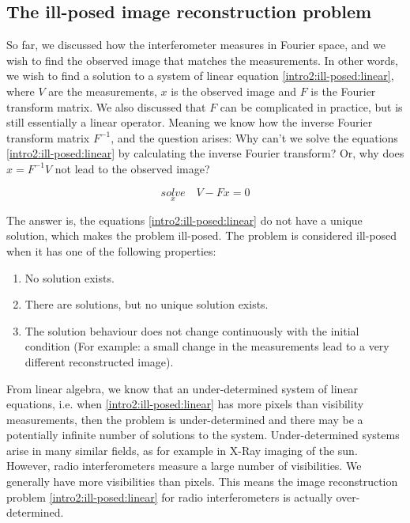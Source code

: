 \subsection{The ill-posed image reconstruction problem}\label{intro2:ill-posed}
So far, we discussed how the interferometer measures in Fourier space, and we wish to find the observed image that matches the measurements. In other words, we wish to find a solution to a system of linear equation \eqref{intro2:ill-posed:linear}, where $V$ are the measurements, $x$ is the observed image and $F$ is the Fourier transform matrix. We also discussed that $F$ can be complicated in practice, but is still essentially a linear operator. Meaning we know how the inverse Fourier transform matrix $F^{-1}$, and the question arises: Why can't we solve the equations \eqref{intro2:ill-posed:linear} by calculating the inverse Fourier transform? Or, why does $x = F^{-1} V$ not lead to the observed image?

\begin{equation}\label{intro2:ill-posed:linear}
\underset{x}{solve}\quad V - Fx = 0
\end{equation}

The answer is, the equations \eqref{intro2:ill-posed:linear} do not have a unique solution, which makes the problem ill-posed. The problem is considered ill-posed when it has one of the following properties:
\begin{enumerate}
	\item No solution exists.
	\item There are solutions, but no unique solution exists.
	\item The solution behaviour does not change continuously with the initial condition (For example: a small change in the measurements lead to a very different reconstructed image).
\end{enumerate}
From linear algebra, we know that an under-determined system of linear equations, i.e. when \eqref{intro2:ill-posed:linear} has more pixels than visibility measurements, then the problem is under-determined and there may be a potentially infinite number of solutions to the system. Under-determined systems arise in many similar fields, as for example in X-Ray imaging of the sun\cite{felix2017compressed}. However, radio interferometers measure a large number of visibilities. We generally have more visibilities than pixels. This means the image reconstruction problem \eqref{intro2:ill-posed:linear} for radio interferometers is actually over-determined.

